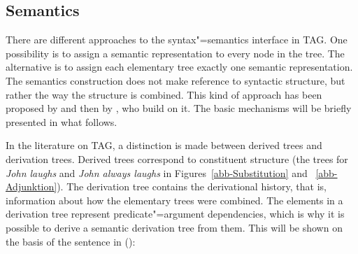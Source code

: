 \subsection{Semantics}

There are different approaches to the syntax"=semantics interface in TAG.
One possibility is to assign a semantic representation to every node in the tree. The alternative is to assign each elementary tree
exactly one semantic representation. The semantics construction does not make reference to syntactic structure, but rather the way
the structure is combined. This kind of approach has been proposed by \citet{CK98a} and then by \citet{KJ2003a}, who build on it.
The basic mechanisms will be briefly presented in what follows.

In the literature on TAG, a distinction is made between derived trees and derivation trees.
Derived trees correspond to constituent structure (the trees for \emph{John laughs} and
\emph{John always laughs} in Figures~\ref{abb-Substitution} and ~\ref{abb-Adjunktion}).
The derivation tree contains the derivational history, that is, information about how the elementary trees were combined.
The elements in a derivation tree represent predicate"=argument dependencies, which is why it is possible to derive
a semantic derivation tree from them. This will be shown on the basis of the sentence in ():

